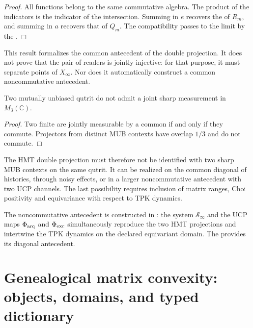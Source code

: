 \begin{proof}
All functions belong to the same commutative algebra. The product
of the indicators is the indicator of the intersection. Summing in $e$ recovers
the \PVM of $R_m$, and summing in $a$ recovers that of $Q_m$. The compatibility passes
to the limit by the .
\end{proof}

This result formalizes the common antecedent of the double projection. It does
not prove that the pair of readers is jointly injective: for that purpose, it must
separate points of $X_\infty$. Nor does it automatically construct a common
noncommutative antecedent.

\begin{proposition}
Two mutually unbiased qutrit \PVM do not admit a joint sharp measurement
in $M_3(\mathbb C)$.
\end{proposition}

\begin{proof}
Two finite \PVM are jointly measurable by a common \PVM if and only if
they commute. Projectors from distinct MUB contexts have overlap $1/3$ and
do not commute.
\end{proof}


The HMT double projection must therefore not be identified with two sharp MUB
contexts on the same qutrit. It can be realized on the common diagonal of
histories, through noisy effects, or in a larger noncommutative antecedent
with two UCP channels. The last possibility requires inclusion of matrix
ranges, Choi positivity and equivariance with respect to TPK dynamics.

\begin{workbox}[fontupper=\footnotesize,fonttitle=\bfseries\footnotesize,
  boxsep=1pt,left=4pt,right=4pt,top=0pt,bottom=0pt,
  toptitle=1pt,bottomtitle=1pt]
The noncommutative antecedent is constructed in
: the system $\mathcal S_\infty$ and the UCP maps
$\Phi_{\rm arq}$ and $\Phi_{\rm exc}$ simultaneously reproduce the two
HMT projections and intertwine the TPK dynamics on the declared equivariant
domain. The 
provides its diagonal antecedent.
\end{workbox}
\fi


\section{Genealogical matrix convexity: objects, domains, and typed dictionary}


